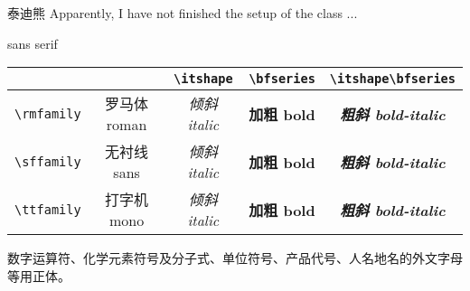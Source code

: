 \documentclass[fontset = mac ms]{seuthesis2024b}
\begin{document}
  泰迪熊 Apparently, I have not finished the setup of the class ...
  
  \textsf{sans serif}

  \begin{center}
    \begin{tabular}{c|cccc}
      & & \verb|\itshape| & \verb|\bfseries| & \verb|\itshape\bfseries| \\
      \hline
      \verb|\rmfamily| & \rmfamily 罗马体 roman & \rmfamily\itshape 倾斜 italic & \rmfamily\bfseries 加粗 bold & \rmfamily\itshape\bfseries 粗斜 bold-italic \\
      \verb|\sffamily| & \sffamily 无衬线 sans  & \sffamily\itshape 倾斜 italic & \sffamily\bfseries 加粗 bold & \sffamily\itshape\bfseries 粗斜 bold-italic \\
      \verb|\ttfamily| & \ttfamily 打字机 mono  & \ttfamily\itshape 倾斜 italic & \ttfamily\bfseries 加粗 bold & \ttfamily\itshape\bfseries 粗斜 bold-italic
    \end{tabular}
  \end{center}

  \clearpage

  \noindent
  数字运算符、化学元素符号及分子式、单位符号、产品代号、人名地名的外文字母等用正体。

  ~

  \clearpage

  ~
\end{document}
